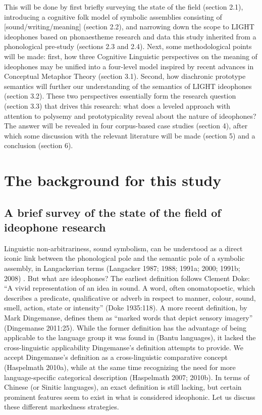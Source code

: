 \documentclass[12pt,article,oneside]{memoir}
\theoremstyle{definition}
\theoremstyle{definition}
\theoremstyle{definition}
\theoremstyle{remark}
\begin{document}
This will be done by first briefly surveying the state of the field
(section 2.1), introducing a cognitive folk model of symbolic assemblies
consisting of {[}sound/writing/meaning{]} (section 2.2), and narrowing
down the scope to LIGHT ideophones based on phonaestheme research and
data this study inherited from a phonological pre-study (sections 2.3
and 2.4). Next, some methodological points will be made: first, how
three Cognitive Linguistic perspectives on the meaning of ideophones may
be unified into a four-level model inspired by recent advances in
Conceptual Metaphor Theory (section 3.1). Second, how diachronic
prototype semantics will further our understanding of the semantics of
LIGHT ideophones (section 3.2). These two perspectives essentially form
the research question (section 3.3) that drives this research: what does
a leveled approach with attention to polysemy and prototypicality reveal
about the nature of ideophones? The answer will be revealed in four
corpus-based case studies (section 4), after which some discussion with
the relevant literature will be made (section 5) and a conclusion
(section 6).

\section{The background for this
study}\label{the-background-for-this-study}

\subsection{A brief survey of the state of the field of ideophone
research}\label{a-brief-survey-of-the-state-of-the-field-of-ideophone-research}

Linguistic non-arbitrariness, sound symbolism, can be understood as a
direct iconic link between the phonological pole and the semantic pole
of a symbolic assembly, in Langackerian terms (Langacker 1987; 1988;
1991a; 2000; 1991b; 2008) . But what are ideophones? The earliest
definition follows Clement Doke: ``A vivid representation of an idea in
sound. A word, often onomatopoetic, which describes a predicate,
qualificative or adverb in respect to manner, colour, sound, smell,
action, state or intensity'' (Doke 1935:118). A more recent definition,
by Mark Dingemanse, defines them as ``marked words that depict sensory
imagery'' (Dingemanse 2011:25). While the former definition has the
advantage of being applicable to the language group it was found in
(Bantu languages), it lacked the cross-linguistic applicability
Dingemanse's definition attempts to provide. We accept Dingemanse's
definition as a cross-linguistic comparative concept (Haspelmath 2010a),
while at the same time recognizing the need for more language-specific
categorical description (Haspelmath 2007; 2010b). In terms of Chinese
(or Sinitic languages), an exact definition is still lacking, but
certain prominent features seem to exist in what is considered
ideophonic. Let us discuss these different markedness strategies.
\end{document}
